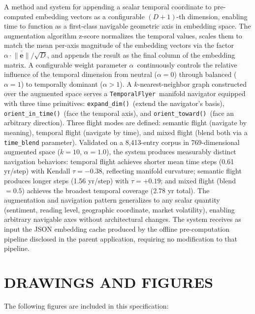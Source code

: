 \documentclass[12pt,letterpaper]{article}
\newcommand{\temporalflyer}{\texttt{TemporalFlyer}}
\newcommand{\expanddim}{\texttt{expand\_dim()}}
\newcommand{\orientintime}{\texttt{orient\_in\_time()}}
\newcommand{\orienttoward}{\texttt{orient\_toward()}}
\newcommand{\alphabar}{$\alpha$}
\begin{document}
A method and system for appending a scalar temporal coordinate to pre-computed
embedding vectors as a configurable $(D+1)$-th dimension, enabling time to
function as a first-class navigable geometric axis in embedding space. The
augmentation algorithm z-score normalizes the temporal values, scales them to
match the mean per-axis magnitude of the embedding vectors via the factor
$\alpha \cdot \bar{\|\mathbf{e}\|}/\sqrt{D}$, and appends the result as the
final column of the embedding matrix. A configurable weight parameter
\alphabar\ continuously controls the relative influence of the temporal
dimension from neutral ($\alpha = 0$) through balanced ($\alpha = 1$) to
temporally dominant ($\alpha > 1$). A $k$-nearest-neighbor graph constructed
over the augmented space serves a \temporalflyer\ manifold navigator equipped
with three time primitives: \expanddim\ (extend the navigator's basis),
\orientintime\ (face the temporal axis), and \orienttoward\ (face an arbitrary
direction). Three flight modes are defined: semantic flight (navigate by
meaning), temporal flight (navigate by time), and mixed flight (blend both via
a \texttt{time\_blend} parameter). Validated on a 8,413-entry corpus in
769-dimensional augmented space ($k=10$, $\alpha=1.0$), the system produces
measurably distinct navigation behaviors: temporal flight achieves shorter mean
time steps (0.61 yr/step) with Kendall $\tau = -0.38$, reflecting manifold
curvature; semantic flight produces longer steps (1.56 yr/step) with
$\tau = +0.19$; and mixed flight (blend~$= 0.5$) achieves the broadest
temporal coverage (2.78 yr total). The augmentation and navigation pattern
generalizes to any scalar quantity (sentiment, reading level, geographic
coordinate, market volatility), enabling arbitrary navigable axes without
architectural changes. The system receives as input the JSON embedding cache
produced by the offline pre-computation pipeline disclosed in the parent
application, requiring no modification to that pipeline.


\newpage
\section*{DRAWINGS AND FIGURES}

The following figures are included in this specification:
\end{document}
